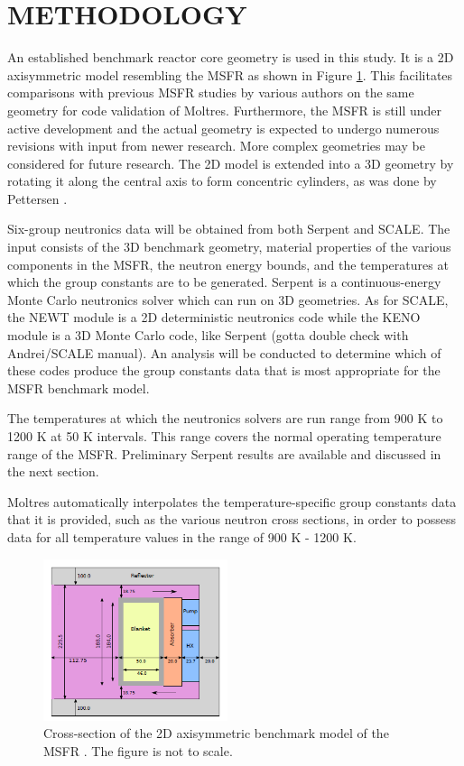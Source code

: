 \documentclass{anstrans}
\begin{document}
\section{METHODOLOGY}

An established benchmark reactor core geometry is used in this study. It is a 2D axisymmetric model resembling the MSFR as shown in Figure \ref{fig:benchmark}. This facilitates comparisons with previous MSFR studies by various authors \cite{fiorina_modelling_2014} \cite{pettersen_coupled_2016} on the same geometry for code validation of Moltres. Furthermore, the MSFR is still under active development and the actual geometry is expected to undergo numerous revisions with input from newer research. More complex geometries may be considered for future research. The 2D model is extended into a 3D geometry by rotating it along the central axis to form concentric cylinders, as was done by Pettersen \cite{pettersen_coupled_2016}.

Six-group neutronics data will be obtained from both Serpent and SCALE. The input consists of the 3D benchmark geometry, material properties of the various components in the MSFR, the neutron energy bounds, and the temperatures at which the group constants are to be generated. Serpent is a continuous-energy Monte Carlo neutronics solver which can run on 3D geometries. As for SCALE, the NEWT module is a 2D deterministic neutronics code while the KENO module is a 3D Monte Carlo code, like Serpent (gotta double check with Andrei/SCALE manual). An analysis will be conducted to determine which of these codes produce the group constants data that is most appropriate for the MSFR benchmark model. 

The temperatures at which the neutronics solvers are run range from 900 K to 1200 K at 50 K intervals. This range covers the normal operating temperature range of the MSFR. Preliminary Serpent results are available and discussed in the next section.

Moltres automatically interpolates the temperature-specific group constants data that it is provided, such as the various neutron cross sections, in order to possess data for all temperature values in the range of 900 K - 1200 K. 

\begin{figure}[t] 
	\centering
	\includegraphics[width=0.48\textwidth]{./figures/benchmark}
	\captionsetup{justification=centering}
	\caption{Cross-section of the 2D axisymmetric benchmark model of the MSFR \cite{pettersen_coupled_2016}. The figure is not to scale.}
	\label{fig:benchmark}
\end{figure} 
\end{document}
